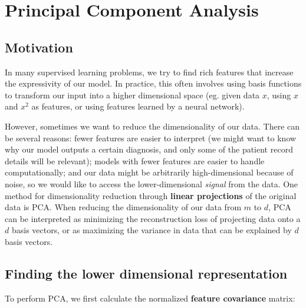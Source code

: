 \documentclass[11pt,letterpaper]{article}
\begin{document}




\section{Principal Component Analysis}

\subsection{Motivation}
In many supervised learning problems, we try to find rich features that increase the expressivity of our model. In practice, this often involves using basis functions to transform our input into a higher dimensional space (eg. given data $x$, using $x$ and $x^2$ as features, or using features learned by a neural network). 

However, sometimes we want to reduce the dimensionality of our data. There can be several reasons: fewer features are easier to interpret (we might want to know why our model outputs a certain diagnosis, and only some of the patient record details will be relevant); models with fewer features are easier to handle computationally; and our data might be arbitrarily high-dimensional because of noise, so we would like to access the lower-dimensional \emph{signal} from the data. One method for dimensionality reduction through \textbf{linear projections} of the original data is PCA. When reducing the dimensionality of our data from $m$ to $d$, PCA can be interpreted as minimizing the reconstruction loss of projecting data onto a $d$ basis vectors, or as maximizing the variance in data that can be explained by $d$ basis vectors. 

\subsection{Finding the lower dimensional representation}

To perform PCA, we first calculate the normalized \textbf{feature covariance} matrix:
\end{document}
